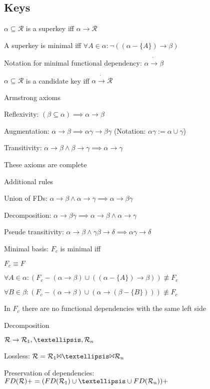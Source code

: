 \subsection{Keys}
\enumstart
	\item $\alpha \subseteq \mathcal{R}$ is a superkey iff $\alpha \rightarrow \mathcal{R}$
	\item A superkey is minimal iff $\forall A \in \alpha: \lnot((\alpha - \{A\})\rightarrow \beta)$
	\item Notation for minimal functional dependency: $\alpha \dot \rightarrow \beta$
	\item $\alpha \subseteq \mathcal{R}$ is a candidate key iff $\alpha \dot \rightarrow \mathcal{R}$
	\item Armstrong axioms
	\enumstart
		\item Reflexivity: $(\beta \subseteq \alpha) \implies \alpha \rightarrow \beta$
		\item Augmentation: $\alpha \rightarrow \beta \implies \alpha\gamma \rightarrow \beta\gamma$ (Notation: $\alpha\gamma := \alpha \cup \gamma$)
		\item Transitivity: $\alpha \rightarrow \beta \land \beta \rightarrow \gamma \implies \alpha \rightarrow \gamma$
		\item These axioms are complete
	\enumend
	\item Additional rules
	\enumstart
		\item Union of FDs: $\alpha \rightarrow \beta \land \alpha \rightarrow \gamma \implies \alpha \rightarrow \beta\gamma$
		\item Decomposition: $\alpha \rightarrow \beta\gamma \implies \alpha \rightarrow \beta \land \alpha \rightarrow \gamma$
		\item Pseude transitivity: $\alpha \rightarrow \beta \land \gamma\beta \rightarrow \delta \implies \alpha\gamma \rightarrow \delta$
	\enumend
	\item Minimal basis: $F_c$ is minimal iff
	\enumstart
		\item $F_c \equiv F$
		\item $\forall A \in \alpha: (F_c - (\alpha \rightarrow \beta) \cup ((\alpha - \{A\})\rightarrow \beta)) \not\equiv F_c$
		\item $\forall B \in \beta: (F_c - (\alpha \rightarrow \beta) \cup (\alpha \rightarrow( \beta - \{B\}))) \not\equiv F_c$
		\item In $F_c$ there are no functional dependencies with the same left side
	\enumend
	\item Decomposition
	\enumstart
		\item $\mathcal{R} \rightarrow \mathcal{R}_1, \ddd, \mathcal{R}_n$
		\item Lossless: $\mathcal{R} = \mathcal{R}_1 \join \ddd \join \mathcal{R}_n$
		\item Preservation of dependencies: $FD(\mathcal{R})+ = (FD(\mathcal{R}_1) \cup \ddd \cup FD(\mathcal{R}_n))+$
	\enumend
\enumend

